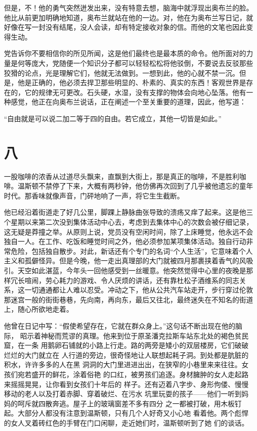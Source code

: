 但是，不！他的勇气突然迸发出来，没有特意去想，脑海中就浮现出奥布兰的脸。他比从前更加明确地知道，奥布兰就站在他的一边。对，他在为奥布兰写日记，就好像在写一封没有结尾，没人会读，却有特定接收对象的信。而他的文笔也因此变得生动。

党告诉你不要相信你的所见所闻，这是他们最终也是最本质的命令。他所面对的力量是何等庞大，党随便一个知识分子都可以轻轻松松将他驳倒，不要说去反驳那些狡猾的论点，光是理解它们，他就无法做到。一想到此，他的心就不禁一沉。但是，他是正确的，他必须去捍卫那些明显的、朴素的、真实的东西！客观世界是存在的，它的规律无可更改。石头硬，水湿，没有支撑的物体会向地心坠落。他有一种感觉，他正在向奥布兰说话，正在阐述一个至关重要的道理，因此，他写道：

``自由就是可以说二加二等于四的自由。若它成立，其他一切皆是如此。''

\section*{八}\label{ux516b}

一股咖啡的浓香从过道尽头飘来，直飘到大街上，那是真正的咖啡，不是胜利咖啡。温斯顿不禁停了下来，大概有两秒钟，他仿佛再次回到了几乎被他遗忘的童年时代。那香味就像声音，门砰地响了一声，将它生生截断。

他已经沿着街道走了好几公里，脚踝上静脉曲张导致的溃疡又痒了起来。这是他三个星期以来第二次没到集体活动中心去，考虑到去集体中心的次数会被仔细记录，这无疑是莽撞之举。从原则上说，党员没有空闲时间，除了上床睡觉，他永远不会独自一人。在工作、吃饭和睡觉时间之外，他必须参加某项集体活动。独自行动非常危险，包括独自散步。对此，新话还有个专门的名词``个人生活''，它意味着个人主义和孤僻怪异。但是今晚，他一走出真理部的大门就被四月那裹挟着香气的风吸引。天空如此湛蓝，今年头一回他感受到一丝暖意。他突然觉得中心里的夜晚是那样冗长喧闹，劳心耗力的游戏、令人厌烦的讲话，还有靠杜松子酒维系的同志关系，这一切通通都让人难以忍受。冲动之下，他从公共汽车站走开，步行穿过伦敦那迷宫一般的街街巷巷，先向南，再向东，最后又往北，最终迷失在不知名的街道上，随心所欲地走着。

他曾在日记中写：``假使希望存在，它就在群众身上。''这句话不断出现在他的脑际，
昭示着神秘而荒谬的真理。他来到位于原圣潘克拉斯车站东北处的褐色贫民窟，在一条
用鹅卵石铺就的小路上行走。路的两旁是矮小的双层楼房，它们破破烂烂的大门就立在
人行道的旁边，很奇怪地让人联想起耗子洞。到处都是肮脏的积水，许许多多的人在黑
洞洞的大门里进进出出，在狭窄的小巷里来来往往。女孩们宛若盛开的鲜花，涂着俗艳
的口红，被男孩们追逐。身材臃肿的女人走起路来摇摇晃晃，让你看到女孩们十年后的
样子。还有迈着八字步、身形佝偻、慢慢移动的老人以及打着赤脚、穿着破烂、在污水
坑里玩耍的孩子——他们一听到妈妈的呵斥就四散奔逃。屋子上的玻璃窗差不多有四分
之一都被打破，用木板钉起。大部分人都没有注意到温斯顿，只有几个人好奇又小心地
看着他。两个彪悍的女人叉着砖红色的手臂在门口闲聊，走近她们时，温斯顿听到了她
们的谈话。

